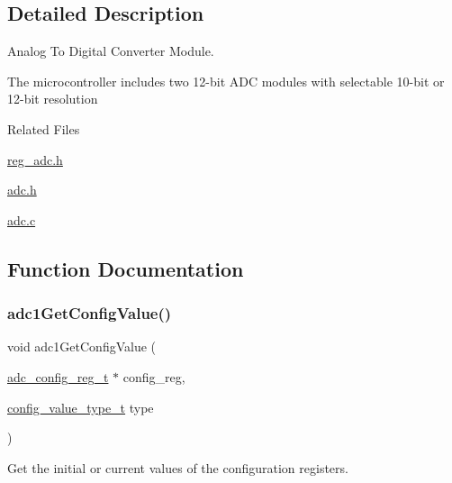 \subsection{Detailed Description}
Analog To Digital Converter Module. 

The microcontroller includes two 12-\/bit A\+DC modules with selectable 10-\/bit or 12-\/bit resolution

Related Files
\begin{DoxyItemize}
\item \mbox{\hyperlink{reg__adc_8h}{reg\+\_\+adc.\+h}}
\item \mbox{\hyperlink{adc_8h}{adc.\+h}}
\item \mbox{\hyperlink{adc_8c}{adc.\+c}} 
\end{DoxyItemize}

\subsection{Function Documentation}
\mbox{\label{group__ADC_ga919d1c45d7b1bdab5eb226dddad5a428}} 
\subsubsection{\texorpdfstring{adc1\+Get\+Config\+Value()}{adc1GetConfigValue()}}
{\footnotesize\ttfamily void adc1\+Get\+Config\+Value (\begin{DoxyParamCaption}\item[{\mbox{\hyperlink{structadc__config__reg}{adc\+\_\+config\+\_\+reg\+\_\+t}} $\ast$}]{config\+\_\+reg,  }\item[{\mbox{\hyperlink{sys__common_8h_a9daf9a5992391b058477d28d107ee5e2}{config\+\_\+value\+\_\+type\+\_\+t}}}]{type }\end{DoxyParamCaption})}



Get the initial or current values of the configuration registers. 


